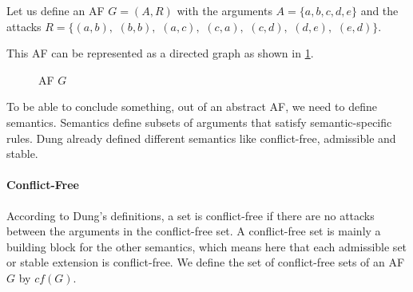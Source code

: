 \begin{example}
    Let us define an AF $G = (A, R)$ with the arguments
    $A=\{a, b, c, d, e\}$ and the attacks
    $R=\bigl\{(a,b),$
    $(b,b),$
    $(a,c),$
    $(c,a),$
    $(c,d),$
    $(d,e),$
    $(e,d)\bigl\}.$

    This AF can be represented as a directed graph as shown in \cref{af:backgroundAFexample1}.
    \begin{figure}[h]
        \centering
        \caption{\ac{AF} $G$}
        \label{af:backgroundAFexample1}
    \end{figure}
\end{example}

To be able to conclude something, out of an abstract AF, we need to define semantics. Semantics define subsets of arguments that satisfy semantic-specific rules. Dung already defined different semantics \cite{Dung1995-DUNOTA-2} like conflict-free, admissible and stable.

\newpage
\paragraph{Conflict-Free} According to Dung's definitions, a set is conflict-free if there are no attacks between the arguments in the conflict-free set. A conflict-free set is mainly a building block for the other semantics, which means here that each admissible set or stable extension is conflict-free. We define the set of conflict-free sets of an AF $G$ by $cf(G)$.

